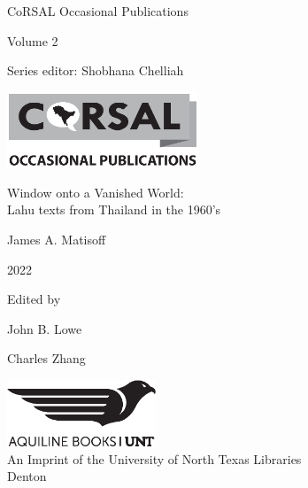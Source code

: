 \thispagestyle{empty}
\begin{center}

\vspace{4cm}
{\Large CoRSAL Occasional Publications}

\vspace{2cm}

{\Large Volume 2}

\vspace{8cm}

Series editor: Shobhana Chelliah

\includegraphics[width=2.25in]{CoRSALBWlogo}\\

\end{center}
\clearpage{\thispagestyle{empty}\cleardoublepage}
\begin{center}
\thispagestyle{empty}
\vspace{4cm}
{\huge Window onto a Vanished World:\\\vspace{.75em}Lahu texts from Thailand in the 1960’s}

\vspace{3cm}

{\Large James A. Matisoff}
\vspace{2cm}

2022

\vspace{2cm}

Edited by

John B. Lowe

Charles Zhang

\vspace{4cm}
\includegraphics[width=1.75in]{AquilineBooksUNT.eps}\\
\vspace{1cm}
An Imprint of the University of North Texas Libraries\\
\vspace{1cm}
Denton
\end{center}
